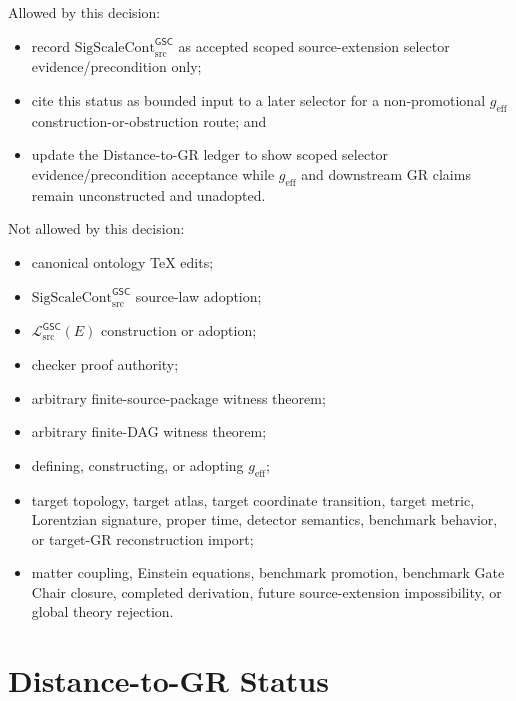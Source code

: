 \documentclass[11pt]{article}
\newcommand{\MetricData}{\mathcal{L}_{\mathrm{src}}^{\mathsf{GSC}}}
\newcommand{\geff}{g_{\mathrm{eff}}}
\newcommand{\SigScaleCont}{\mathrm{SigScaleCont}_{\mathrm{src}}^{\mathsf{GSC}}}
\begin{document}
Allowed by this decision:
\begin{itemize}[leftmargin=*]
  \item record \(\SigScaleCont\) as accepted scoped source-extension selector
  evidence/precondition only;
  \item cite this status as bounded input to a later selector for a
  non-promotional \(\geff\) construction-or-obstruction route; and
  \item update the Distance-to-GR ledger to show scoped selector
  evidence/precondition acceptance while \(\geff\) and downstream GR claims
  remain unconstructed and unadopted.
\end{itemize}

Not allowed by this decision:
\begin{itemize}[leftmargin=*]
  \item canonical ontology TeX edits;
  \item \(\SigScaleCont\) source-law adoption;
  \item \(\MetricData(E)\) construction or adoption;
  \item checker proof authority;
  \item arbitrary finite-source-package witness theorem;
  \item arbitrary finite-DAG witness theorem;
  \item defining, constructing, or adopting \(\geff\);
  \item target topology, target atlas, target coordinate transition, target
  metric, Lorentzian signature, proper time, detector semantics, benchmark
  behavior, or target-GR reconstruction import;
  \item matter coupling, Einstein equations, benchmark promotion, benchmark
  Gate Chair closure, completed derivation, future source-extension
  impossibility, or global theory rejection.
\end{itemize}

\section{Distance-to-GR Status}
\end{document}
